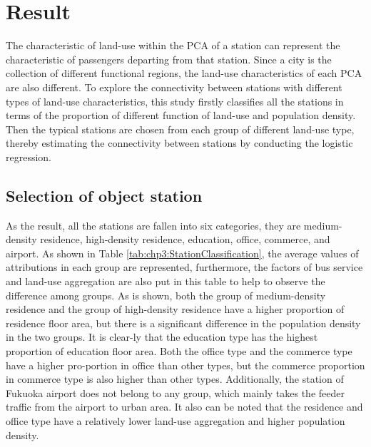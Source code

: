 \section{Result}
%
The characteristic of land-use within the PCA of a station can represent the characteristic of passengers departing from that station. Since a city is the collection of different functional regions, the land-use characteristics of each PCA are also different. To explore the connectivity between stations with different types of land-use characteristics, this study firstly classifies all the stations in terms of the proportion of different function of land-use and population density. Then the typical stations are chosen from each group of different land-use type, thereby estimating the connectivity between stations by conducting the logistic regression. 

\subsection{Selection of object station}
%
As the result, all the stations are fallen into six categories, they are medium-density residence, high-density residence, education, office, commerce, and airport. As shown in Table \ref{tab:chp3:StationClassification}, the average values of attributions in each group are represented, furthermore, the factors of bus service and land-use aggregation are also put in this table to help to observe the difference among groups. As is shown, both the group of medium-density residence and the group of high-density residence have a higher proportion of residence floor area, but there is a significant difference in the population density in the two groups. It is clear-ly that the education type has the highest proportion of education floor area. Both the office type and the commerce type have a higher pro-portion in office than other types, but the commerce proportion in commerce type is also higher than other types. Additionally, the station of Fukuoka airport does not belong to any group, which mainly takes the feeder traffic from the airport to urban area. It also can be noted that the residence and office type have a relatively lower land-use aggregation and higher population density.

